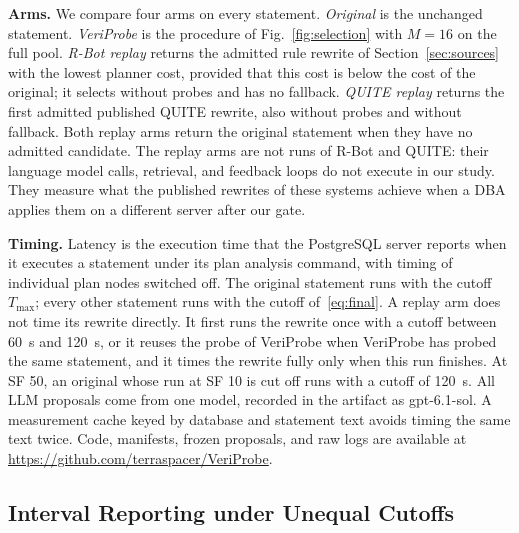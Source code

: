 \documentclass[conference]{IEEEtran}
\newcommand{\sys}{VeriProbe}
\begin{document}
\textbf{Arms.}
We compare four arms on every statement.
\emph{Original} is the unchanged statement.
\emph{\sys{}} is the procedure of Fig.~\ref{fig:selection} with $M = 16$ on the full pool.
\emph{R-Bot replay} returns the admitted rule rewrite of Section~\ref{sec:sources} with the lowest planner cost, provided that this cost is below the cost of the original; it selects without probes and has no fallback.
\emph{QUITE replay} returns the first admitted published QUITE rewrite, also without probes and without fallback.
Both replay arms return the original statement when they have no admitted candidate.
The replay arms are not runs of R-Bot and QUITE: their language model calls, retrieval, and feedback loops do not execute in our study.
They measure what the published rewrites of these systems achieve when a DBA applies them on a different server after our gate.

\textbf{Timing.}
Latency is the execution time that the PostgreSQL server reports when it executes a statement under its plan analysis command, with timing of individual plan nodes switched off.
The original statement runs with the cutoff $T_{\max}$; every other statement runs with the cutoff of~\eqref{eq:final}.
A replay arm does not time its rewrite directly. It first runs the rewrite once with a cutoff between \SI{60}{\second} and \SI{120}{\second}, or it reuses the probe of \sys{} when \sys{} has probed the same statement, and it times the rewrite fully only when this run finishes.
At SF 50, an original whose run at SF 10 is cut off runs with a cutoff of \SI{120}{\second}.
All LLM proposals come from one model, recorded in the artifact as gpt-6.1-sol.
A measurement cache keyed by database and statement text avoids timing the same text twice.
Code, manifests, frozen proposals, and raw logs are available at \url{https://github.com/terraspacer/VeriProbe}.

\subsection{Interval Reporting under Unequal Cutoffs}
\label{sec:intervals}
\end{document}
